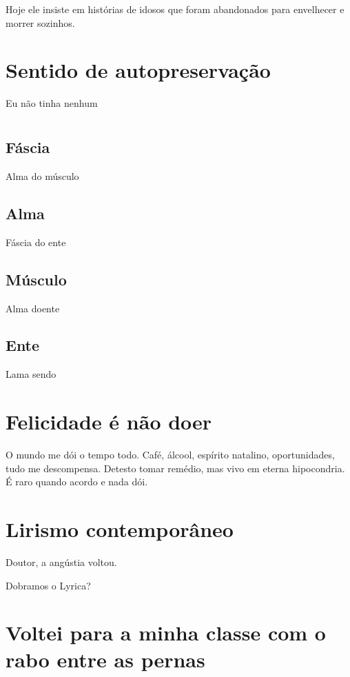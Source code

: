 Hoje ele insiste em histórias de idosos que foram abandonados para
envelhecer e morrer sozinhos.

\chapter{Sentido de autopreservação}

Eu não tinha nenhum

\pagebreak
\chapter*{}

\section{Fáscia}

Alma do músculo

\section{Alma}

Fáscia do ente

\section{Músculo}

Alma doente

\section{Ente}

Lama sendo

\chapter{Felicidade é não doer}

O mundo me dói o tempo todo. Café, álcool, espírito natalino,
oportunidades, tudo me descompensa. Detesto tomar remédio, mas vivo em
eterna hipocondria. É raro quando acordo e nada dói.

\chapter{Lirismo contemporâneo}

Doutor, a angústia voltou.

Dobramos o Lyrica?

\chapter{Voltei para a minha classe com o rabo entre as pernas}


